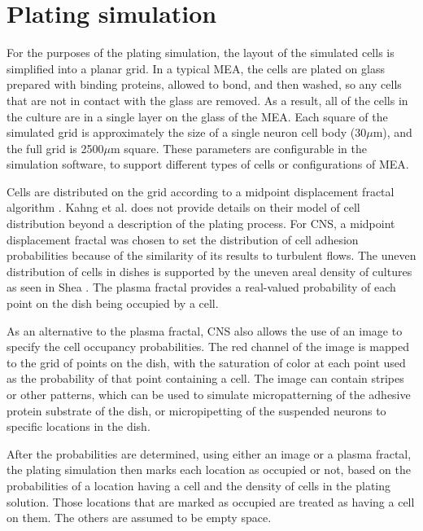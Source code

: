 \documentclass[letterpaper]{article}
\begin{document}
\section{Plating simulation}

For the purposes of the plating simulation, the layout of the simulated cells is simplified into a planar grid. 
In a typical MEA, the cells are plated on glass prepared with binding proteins, allowed to bond, and then washed, so any cells that are not in contact with the glass are removed.
As a result, all of the cells in the culture are in a single layer on the glass of the MEA.
Each square of the simulated grid is approximately the size of a single neuron cell body (30$\mu$m), and the full grid is 2500$\mu$m square.
These parameters are configurable in the simulation software, to support different types of cells or configurations of MEA.

Cells are distributed on the grid according to a midpoint displacement fractal algorithm \cite{Fournier1982Stochastic}. 
Kahng et al. \citeyear{kahng2007stochastic} does not provide details on their model of cell distribution beyond a description of the plating process.
For CNS, a midpoint displacement fractal was chosen to set the distribution of cell adhesion probabilities because of the similarity of its results to turbulent flows. 
The uneven distribution of cells in dishes is supported by the uneven areal density of cultures as seen in Shea \citeyear{shea2009optimization}. 
The plasma fractal provides a real-valued probability of each point on the dish being occupied by a cell. 

As an alternative to the plasma fractal, CNS also allows the use of an image to specify the cell occupancy probabilities. 
The red channel of the image is mapped to the grid of points on the dish, with the saturation of color at each point used as the probability of that point containing a cell. 
The image can contain stripes or other patterns, which can be used to simulate micropatterning of the adhesive protein substrate of the dish, or micropipetting of the suspended neurons to specific locations in the dish. 

After the probabilities are determined, using either an image or a plasma fractal, the plating simulation then marks each location as occupied or not, based on the probabilities of a location having a cell and the density of cells in the plating solution. 
Those locations that are marked as occupied are treated as having a cell on them. The others are assumed to be empty space. 
\end{document}
